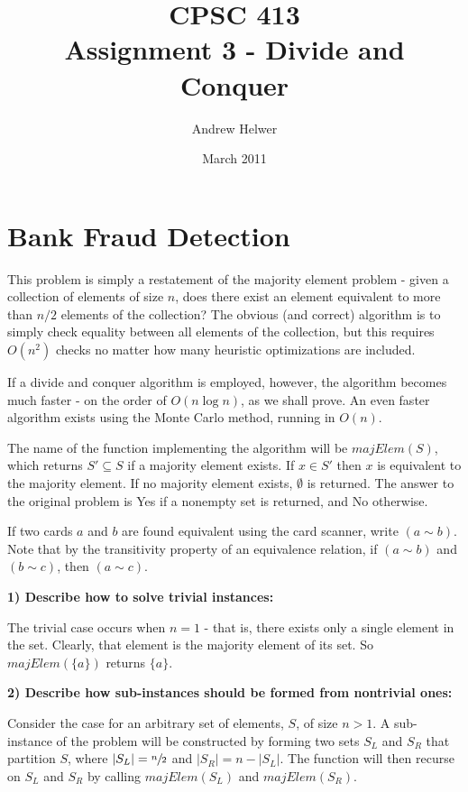 \documentclass{article}
\begin{document}
\title{CPSC 413 \\ Assignment 3 - Divide and Conquer}
\author{Andrew Helwer}
\date{March 2011}
\maketitle

\section{Bank Fraud Detection}

This problem is simply a restatement of the majority element problem - given a
collection of elements of size $n$, does there exist an element equivalent to
more than $n/2$ elements of the collection? The obvious (and correct) algorithm
is to simply check equality between all elements of the collection, but this
requires $O(n^2)$ checks no matter how many heuristic optimizations are
included.

If a divide and conquer algorithm is employed, however, the algorithm becomes
much faster - on the order of $O(n \log n)$, as we shall prove. An even faster
algorithm exists using the Monte Carlo method, running in $O(n)$. 

The name of the function implementing the algorithm will be $majElem(S)$, which
returns $S' \subseteq S$ if a majority element exists. If $x \in S'$ then $x$ is
equivalent to the majority element. If no majority element exists, $\emptyset$
is returned. The answer to the original problem is Yes if a nonempty set is
returned, and No otherwise.

If two cards $a$ and $b$ are found equivalent using the card scanner, write $(a
\sim b)$. Note that by the transitivity property of an equivalence relation, if
$(a \sim b)$ and $(b \sim c)$, then $(a \sim c)$.

\textbf{1) Describe how to solve trivial instances:}

The trivial case occurs when $n=1$ - that is, there exists only a single element
in the set. Clearly, that element is the majority element of its set. So
$majElem(\{a\})$ returns $\{a\}$.

\textbf{2) Describe how sub-instances should be formed from nontrivial ones:}

Consider the case for an arbitrary set of elements, $S$, of size $n>1$. A
sub-instance of the problem will be constructed by forming two sets $S_L$ and
$S_R$ that partition $S$, where $|S_L| = \sfrac{n}{2}$ and $|S_R| = n - |S_L|$.
The function will then recurse on $S_L$ and $S_R$ by calling $majElem(S_L)$ and
$majElem(S_R)$.
\end{document}
